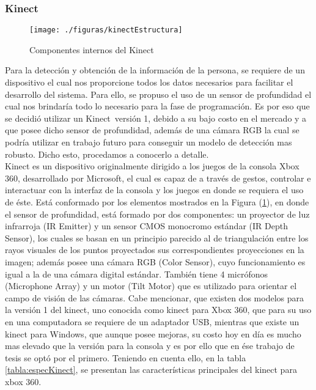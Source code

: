 \documentclass[a4paper,openright,12pt]{report}
\begin{document}
\subsubsection{Kinect}
\begin{figure}[thb]
	\centering
	\texttt{[image: ./figuras/kinectEstructura]}
	\caption{Componentes internos del Kinect} \label{fig:kinectEstructura}
\end{figure}
Para la detección y obtención de la información de la persona, se requiere de un dispositivo el cual nos proporcione todos los datos necesarios para facilitar el desarrollo del sistema. Para ello, se propuso el uso de un sensor de profundidad el cual nos brindaría todo lo necesario para la fase de programación. Es por eso que se decidió utilizar un Kinect\textregistered\ versión 1, debido a su bajo costo en el mercado y a que posee dicho sensor de profundidad, además de una cámara RGB la cual se podría utilizar en trabajo futuro para conseguir un modelo de detección mas robusto. Dicho esto, procedamos a conocerlo a detalle.\\
Kinect es un dispositivo originalmente dirigido a los juegos de la consola Xbox 360\textregistered, desarrollado por Microsoft, el cual es capaz de a través de gestos, controlar e interactuar con la interfaz de la consola y los juegos en donde se requiera el uso de éste. Está conformado por los elementos mostrados en la Figura (\ref{fig:kinectEstructura}), en donde el sensor de profundidad, está formado por dos componentes: un proyector de luz infrarroja (IR Emitter) y un sensor CMOS monocromo estándar (IR Depth Sensor), los cuales se basan en un principio parecido al de triangulación entre los rayos visuales de los puntos proyectados sus correspondientes proyecciones en la imagen; además posee una cámara RGB (Color Sensor), cuyo funcionamiento es igual a la de una cámara digital estándar. También tiene 4 micrófonos (Microphone Array) y un motor (Tilt Motor) que es utilizado para orientar el campo de visión de las cámaras. Cabe mencionar, que existen dos modelos para la versión 1 del kinect, uno conocida como kinect para Xbox 360, que para su uso en una computadora se requiere de un adaptador USB, mientras que existe un kinect para Windows, que aunque posee mejoras, su costo hoy en día es mucho mas elevado que la versión para la consola y es por ello que en ése trabajo de tesis se optó por el primero. Teniendo en cuenta ello, en la tabla \ref{tabla:especKinect}, se presentan las características principales del kinect para xbox 360.\\
\end{document}
